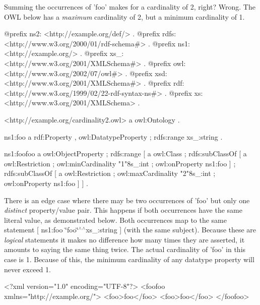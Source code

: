 Summing the occurrences of 'foo' makes for a cardinality of 2, right? Wrong. The OWL below has a {\itshape maximum\/} cardinality of 2, but a minimum cardinality of 1.


\begin{DoxyCodeInclude}
@prefix ns2:     <http://example.org/def/> .
@prefix rdfs:    <http://www.w3.org/2000/01/rdf-schema#> .
@prefix ns1:     <http://example.org/> .
@prefix xs_:     <http://www.w3.org/2001/XMLSchema#> .
@prefix owl:     <http://www.w3.org/2002/07/owl#> .
@prefix xsd:     <http://www.w3.org/2001/XMLSchema#> .
@prefix rdf:     <http://www.w3.org/1999/02/22-rdf-syntax-ns#> .
@prefix xs:      <http://www.w3.org/2001/XMLSchema> .

<http://example.org/cardinality2.owl>
      a       owl:Ontology .

ns1:foo
      a       rdf:Property , owl:DatatypeProperty ;
      rdfs:range xs_:string .

ns1:foofoo
      a       owl:ObjectProperty ;
      rdfs:range
              [ a       owl:Class ;
                rdfs:subClassOf
                        [ a       owl:Restriction ;
                          owl:minCardinality "1"^^xs_:int ;
                          owl:onProperty ns1:foo
                        ] ;
                rdfs:subClassOf
                        [ a       owl:Restriction ;
                          owl:maxCardinality "2"^^xs_:int ;
                          owl:onProperty ns1:foo
                        ]
              ] .
\end{DoxyCodeInclude}


There is an edge case where there may be two occurrences of 'foo' but only one {\itshape distinct\/} property/value pair. This happens if both occurrences have the same literal value, as demonstrated below. Both occurrences map to the same statement \mbox{[} ns1:foo \char`\"{}foo\char`\"{}$^\wedge$$^\wedge$xs\_\-:string \mbox{]} (with the same subject). Because these are {\itshape logical\/} statements it makes no difference how many times they are asserted, it amounts to saying the same thing twice. The actual cardinality of 'foo' in this case is 1. Because of this, the minimum cardinality of any datatype property will never exceed 1.


\begin{DoxyCodeInclude}
<?xml version="1.0" encoding="UTF-8"?>
<foofoo xmlns="http://example.org/">
        <foo>foo</foo>
        <foo>foo</foo>
</foofoo>
\end{DoxyCodeInclude}



